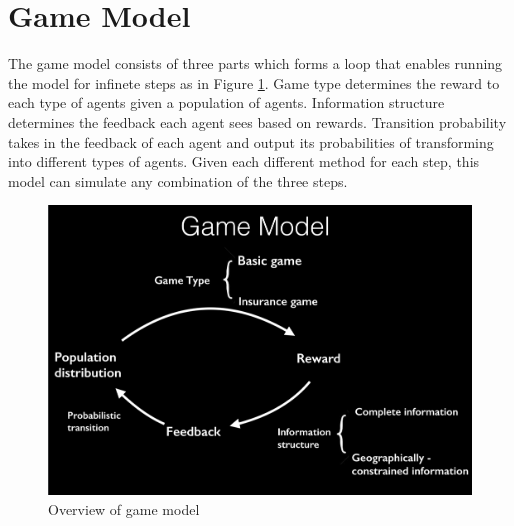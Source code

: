 \documentclass[11pt]{article}
\begin{document}
\section{Game Model}
The game model consists of three parts which forms a loop that enables running the model for infinete steps as in Figure \ref{fig:game_model}. Game type determines the reward to each type of agents given a population of agents. Information structure determines the feedback each agent sees based on rewards. Transition probability takes in the feedback of each agent and output its probabilities of transforming into different types of agents. Given each different method for each step, this model can simulate any combination of the three steps.

\begin{figure}[!h]
  \centering
  \caption{Overview of game model}
  \label{fig:game_model}
  \includegraphics[scale=0.4]{game_model.pdf}
\end{figure}
\end{document}
